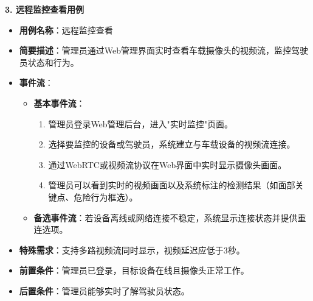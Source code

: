 \documentclass[a4paper,12pt]{article}
\begin{document}
\textbf{3. 远程监控查看用例}
\begin{itemize}
    \item \textbf{用例名称}：远程监控查看
    \item \textbf{简要描述}：管理员通过Web管理界面实时查看车载摄像头的视频流，监控驾驶员状态和行为。
    \item \textbf{事件流}：
    \begin{itemize}
        \item \textbf{基本事件流}：
        \begin{enumerate}
            \item 管理员登录Web管理后台，进入"实时监控"页面。
            \item 选择要监控的设备或驾驶员，系统建立与车载设备的视频流连接。
            \item 通过WebRTC或视频流协议在Web界面中实时显示摄像头画面。
            \item 管理员可以看到实时的视频画面以及系统标注的检测结果（如面部关键点、危险行为框选）。
        \end{enumerate}
        \item \textbf{备选事件流}：若设备离线或网络连接不稳定，系统显示连接状态并提供重连选项。
    \end{itemize}
    \item \textbf{特殊需求}：支持多路视频流同时显示，视频延迟应低于3秒。
    \item \textbf{前置条件}：管理员已登录，目标设备在线且摄像头正常工作。
    \item \textbf{后置条件}：管理员能够实时了解驾驶员状态。
\end{itemize}
\end{document}
